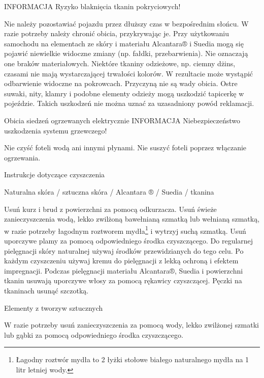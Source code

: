 INFORMACJA
Ryzyko blaknięcia tkanin pokryciowych!
\begin{itemizeTriangle}
	\itemTriangle Nie należy pozostawiać pojazdu przez dłuższy czas w bezpośrednim słońcu. W razie potrzeby należy chronić obicia, przykrywając je.
	\itemTriangle Przy użytkowaniu samochodu na elementach ze skóry i materiału Alcantara® i Suedia mogą się pojawić niewielkie widoczne zmiany (np. fałdki, przebarwienia). Nie oznaczają one braków materiałowych.
	\itemTriangle Niektóre tkaniny odzieżowe, np. ciemny dżins, czasami nie mają wystarczającej trwałości kolorów. W rezultacie może wystąpić odbarwienie widoczne na pokrowcach. Przyczyną nie są wady obicia.
	\itemTriangle Ostre suwaki, nity, klamry i podobne elementy odzieży mogą uszkodzić tapicerkę w pojeździe. Takich uszkodzeń nie można uznać za uzasadniony powód reklamacji.
\end{itemizeTriangle}

Obicia siedzeń ogrzewanych elektrycznie
INFORMACJA
Niebezpieczeństwo uszkodzenia systemu grzewczego!
\begin{itemizeTriangle}
	\itemTriangle Nie czyść foteli wodą ani innymi płynami.
	\itemTriangle Nie suszyć foteli poprzez włączanie ogrzewania.
\end{itemizeTriangle}

Instrukcje dotyczące czyszczenia

Naturalna skóra / sztuczna skóra / Alcantara ® / Suedia / tkanina

\begin{itemizeArrow}
	\itemArrow Usuń kurz i brud z powierzchni za pomocą odkurzacza.
	\itemArrow Usuń świeże zanieczyszczenia wodą, lekko zwilżoną bawełnianą szmatką lub wełnianą szmatką, w razie potrzeby łagodnym roztworem mydła\footnote{Łagodny roztwór mydła to 2 łyżki stołowe białego naturalnego mydła na 1 litr letniej wody.} i wytrzyj suchą szmatką.
	\itemArrow Usuń uporczywe plamy za pomocą odpowiedniego środka czyszczącego.
	\itemArrow Do regularnej pielęgnacji skóry naturalnej używaj środków przewidzianych do tego celu. Po każdym czyszczeniu używaj kremu do pielęgnacji z lekką ochroną i efektem impregnacji.
	\itemArrow Podczas pielęgnacji materiału Alcantara®, Suedia i powierzchni tkanin usuwają uporczywe włosy za pomocą rękawicy czyszczącej. Pęczki na tkaninach usunąć szczotką.
\end{itemizeArrow}

Elementy z tworzyw sztucznych

\begin{itemizeArrow}
	\itemArrow W razie potrzeby usuń zanieczyszczenia za pomocą wody, lekko zwilżonej szmatki lub gąbki za pomocą odpowiedniego środka czyszczącego.
\end{itemizeArrow}

